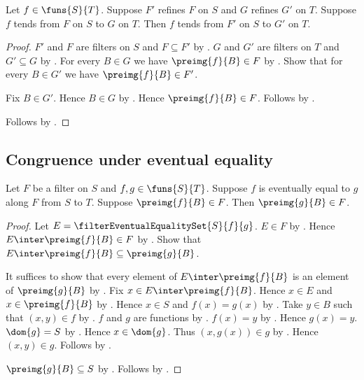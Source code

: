 \begin{theorem}\label{filter_tendsto_mono}
    Let $f\in\funs{S}{T}$.
    Suppose $F'$ refines $F$ on $S$ and $G$ refines $G'$ on $T$.
    Suppose $f$ tends from $F$ on $S$ to $G$ on $T$.
    Then $f$ tends from $F'$ on $S$ to $G'$ on $T$.
\end{theorem}
\begin{proof}
    $F'$ and $F$ are filters on $S$ and $F\subseteq F'$ by
        .
    $G$ and $G'$ are filters on $T$ and $G'\subseteq G$ by
        .
    For every $B\in G$ we have $\preimg{f}{B}\in F$ by
        .
    Show that for every $B\in G'$ we have $\preimg{f}{B}\in F'$.
    \begin{subproof}
        Fix $B\in G'$.
        Hence $B\in G$ by .
        Hence $\preimg{f}{B}\in F$.
        Follows by .
    \end{subproof}
    Follows by .
\end{proof}

\subsection{Congruence under eventual equality}

\begin{proposition}\label{filter_eventually_equal_preimage_membership}
    Let $F$ be a filter on $S$ and $f,g\in\funs{S}{T}$.
    Suppose $f$ is eventually equal to $g$ along $F$ from $S$ to $T$.
    Suppose $\preimg{f}{B}\in F$.
    Then $\preimg{g}{B}\in F$.
\end{proposition}
\begin{proof}
    Let $E=\filterEventualEqualitySet{S}{f}{g}$.
    $E\in F$ by .
    Hence $E\inter\preimg{f}{B}\in F$ by .
    Show that $E\inter\preimg{f}{B}\subseteq\preimg{g}{B}$.
    \begin{subproof}
        It suffices to show that every element of
            $E\inter\preimg{f}{B}$ is an element of $\preimg{g}{B}$ by
            .
        Fix $x\in E\inter\preimg{f}{B}$.
        Hence $x\in E$ and $x\in\preimg{f}{B}$ by .
        Hence $x\in S$ and $f(x)=g(x)$ by
            .
        Take $y\in B$ such that $(x,y)\in f$ by .
        $f$ and $g$ are functions by .
        $f(x)=y$ by .
        Hence $g(x)=y$.
        $\dom{g}=S$ by .
        Hence $x\in\dom{g}$.
        Thus $(x,g(x))\in g$ by .
        Hence $(x,y)\in g$.
        Follows by .
    \end{subproof}
    $\preimg{g}{B}\subseteq S$ by .
    Follows by .
\end{proof}

